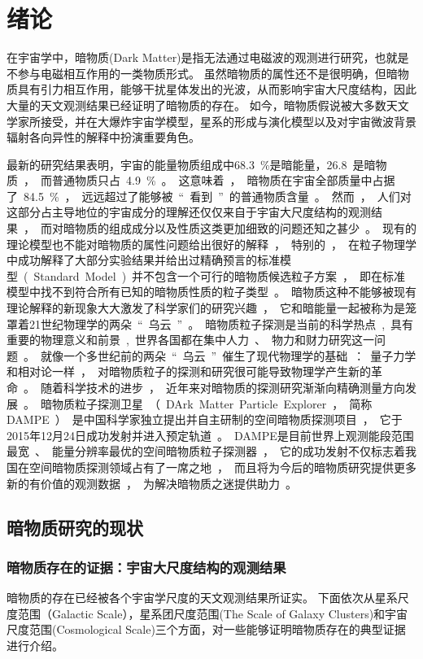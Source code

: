 \chapter{绪论}
\label{ch:introduction}

在宇宙学中，暗物质(Dark Matter)是指无法通过电磁波的观测进行研究，也就是不参与电磁相互作用的一类物质形式。
虽然暗物质的属性还不是很明确，但暗物质具有引力相互作用，能够干扰星体发出的光波，从而影响宇宙大尺度结构，因此大量的天文观测结果已经证明了暗物质的存在。
如今，暗物质假说被大多数天文学家所接受，并在大爆炸宇宙学模型，星系的形成与演化模型以及对宇宙微波背景辐射各向异性的解释中扮演重要角色。

最新的研究结果表明\cite{planck_collaboration_planck_2014}，宇宙的能量物质组成中\SI{68.3}{\percent}是暗能量，\SI{26.8}是暗物质，而普通物质只占\SI{4.9}{\percent}。这意味着，暗物质在宇宙全部质量中占据了\SI{84.5}{\percent}，远远超过了能够被“看到”的普通物质含量。
然而，人们对这部分占主导地位的宇宙成分的理解还仅仅来自于宇宙大尺度结构的观测结果，而对暗物质的组成成分以及性质这类更加细致的问题还知之甚少。
现有的理论模型也不能对暗物质的属性问题给出很好的解释，特别的，在粒子物理学中成功解释了大部分实验结果并给出过精确预言的标准模型(Standard Model)并不包含一个可行的暗物质候选粒子方案，即在标准模型中找不到符合所有已知的暗物质性质的粒子类型。
暗物质这种不能够被现有理论解释的新现象大大激发了科学家们的研究兴趣，它和暗能量一起被称为是笼罩着21世纪物理学的两朵“乌云”。
暗物质粒子探测是当前的科学热点, 具有重要的物理意义和前景, 世界各国都在集中人力、物力和财力研究这一问题。
就像一个多世纪前的两朵“乌云”催生了现代物理学的基础：量子力学和相对论一样，对暗物质粒子的探测和研究很可能导致物理学产生新的革命。

随着科学技术的进步，近年来对暗物质的探测研究渐渐向精确测量方向发展。
暗物质粒子探测卫星（DArk Matter Particle Explorer，简称DAMPE）是中国科学家独立提出并自主研制的空间暗物质探测项目，它于2015年12月24日成功发射并进入预定轨道。
DAMPE是目前世界上观测能段范围最宽、能量分辨率最优的空间暗物质粒子探测器，它的成功发射不仅标志着我国在空间暗物质探测领域占有了一席之地，而且将为今后的暗物质研究提供更多新的有价值的观测数据，为解决暗物质之迷提供助力。

\section{暗物质研究的现状}
\subsection{暗物质存在的证据：宇宙大尺度结构的观测结果}
暗物质的存在已经被各个宇宙学尺度的天文观测结果所证实。
下面依次从星系尺度范围（Galactic Scale），星系团尺度范围(The Scale of Galaxy Clusters)和宇宙尺度范围(Cosmological Scale)三个方面，对一些能够证明暗物质存在的典型证据进行介绍。

